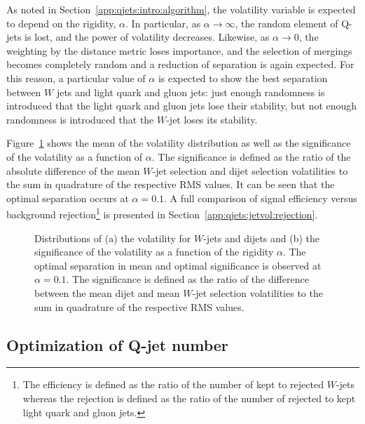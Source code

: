As noted in Section~\ref{app:qjets:intro:algorithm}, the volatility variable is expected to depend on the rigidity, $\alpha$. In particular, as $\alpha\rightarrow\infty$, the random element of Q-jets is lost, and the power of volatility decreases. Likewise, as $\alpha\rightarrow 0$, the weighting by the distance metric loses importance, and the selection of mergings becomes completely random and a reduction of separation is again expected. For this reason, a particular value of $\alpha$ is expected to show the best separation between $W$ jets and light quark and gluon jets: just enough randomness is introduced that the light quark and gluon jets lose their stability, but not enough randomness is introduced that the $W$-jet loses its stability.

Figure~\ref{fig:Vol_vs_alpha} shows the mean of the volatility distribution as well as the significance of the volatility as a function of $\alpha$. The significance is defined as the ratio of the absolute difference of the mean $W$-jet selection and dijet selection volatilities to the sum in quadrature of the respective RMS values. It can be seen that the optimal separation occurs at $\alpha = 0.1$. A full comparison of signal efficiency versus background rejection\footnote{The efficiency is defined as the ratio of the number of kept to rejected $W$-jets whereas the rejection is defined as the ratio of the number of rejected to kept light quark and gluon jets.} is presented in Section~\ref{app:qjets:jetvol:rejection}.

\begin{figure}[htbp]
\centering
{}
\caption{Distributions of (a) the volatility for $W$-jets and dijets and (b) the significance of the volatility  as a function of the rigidity $\alpha$. The optimal separation in mean and optimal significance is observed at $\alpha = 0.1$. The significance is defined as the ratio of the difference between the mean dijet and mean $W$-jet selection volatilities to the sum in quadrature of the respective RMS values.}
\label{fig:Vol_vs_alpha}
\end{figure}

\subsection{Optimization of Q-jet number}
\label{app:qjets:jetvol:number}


